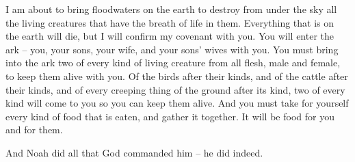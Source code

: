 {I
am about
to bring
floodwaters
on
the earth
to destroy
from under
the sky
all
the living creatures
that have
the breath
of life
in them. Everything
that
is on the earth
will die,
but I will confirm
my covenant
with
you. You will enter
the ark
– you,
your sons,
your wife,
and your sons’
wives
with you.
You must bring
into
the ark
two
of every
kind of living creature
from all
flesh,
male
and female,
to keep them alive
with you.
Of the birds
after their kinds,
and of the cattle
after their kinds,
and of every
creeping thing
of the ground
after its kind,
two
of every
kind will come
to
you so you can keep them alive.
And you
must take
for yourself every
kind of food
that
is eaten,
and gather
it together.
It will be
food for you and for them.
\par }{\PP {}And Noah
did
all
that
God
commanded him – he did indeed.

}
